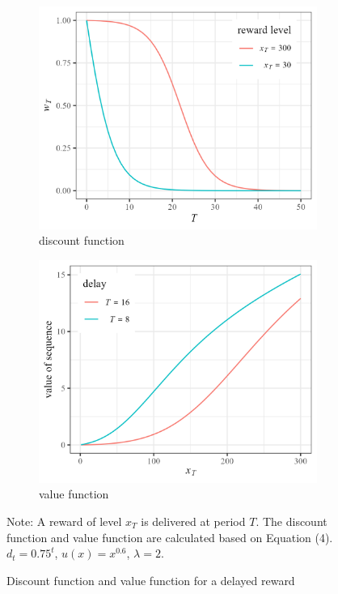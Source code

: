 \documentclass[
  12pt,
]{article}
\begin{document}
\begin{figure}[h]
    \centering
    \begin{subfigure}{0.49\textwidth}
        \centering
        \includegraphics[width=\linewidth]{figures/concave_discount.png} 
        \caption{discount function}
    \end{subfigure}
    \hfill
    \begin{subfigure}{0.49\textwidth}
        \centering
        \includegraphics[width=\linewidth]{figures/s_shape_value.png}
        \caption{value function}
    \end{subfigure}
    \caption{Discount function and value function for a delayed reward}

  \vspace{8pt}
  \begin{minipage}{1.0\textwidth}
{\par\footnotesize Note: A reward of level $x_T$ is delivered at period $T$. The discount function and value function are calculated based on Equation (4). $d_t=0.75^t$, $u(x)=x^{0.6}$, $\lambda=2$.}
\end{minipage}
    
    \label{fig:discount_value_function}
\end{figure}
\end{document}
